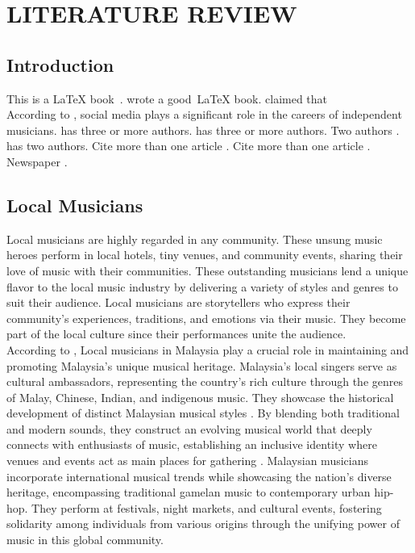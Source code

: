 \chapter{LITERATURE REVIEW}
\label{ch:litreview}

\section{Introduction}
This is a \LaTeX{} book~\parencite{basaran22}. \textcite{abdulrahman22} wrote a good~\LaTeX{} book. \textcite{edlom21} claimed that \\
According to \parencite{haynes18}, social media plays a significant role in the careers of independent musicians.
\textcite{hsu18} has three or more authors.
\textcite{shanmugam19} has three or more authors.
Two authors \parencite{igwenagu16}.
\textcite{jarvekulg21} has two authors.
Cite more than one article \parencite{kaur15,lee20}.
Cite more than one article \parencite{wambua23,wen21}.
Newspaper \parencite{leger21}.
\parencite{liang22}

\section{Local Musicians}
Local musicians are highly regarded in any community. These unsung music heroes perform in local hotels, tiny venues, and community events, sharing their love of music with their communities. These outstanding musicians lend a unique flavor to the local music industry by delivering a variety of styles and genres to suit their audience. Local musicians are storytellers who express their community's experiences, traditions, and emotions via their music. They become part of the local culture since their performances unite the audience. \\

According to \textcite{mohd21}, Local musicians in Malaysia play a crucial role in maintaining and promoting Malaysia's unique musical heritage. Malaysia's local singers serve as cultural ambassadors, representing the country's rich culture through the genres of Malay, Chinese, Indian, and indigenous music. They showcase the historical development of distinct Malaysian musical styles \parencite{mohd21}. By blending both traditional and modern sounds, they construct an evolving musical world that deeply connects with enthusiasts of music, establishing an inclusive identity where venues and events act as main places for gathering \parencite{ong19}. Malaysian musicians incorporate international musical trends while showcasing the nation's diverse heritage, encompassing traditional gamelan music to contemporary urban hip-hop. They perform at festivals, night markets, and cultural events, fostering solidarity among individuals from various origins through the unifying power of music in this global community. 

